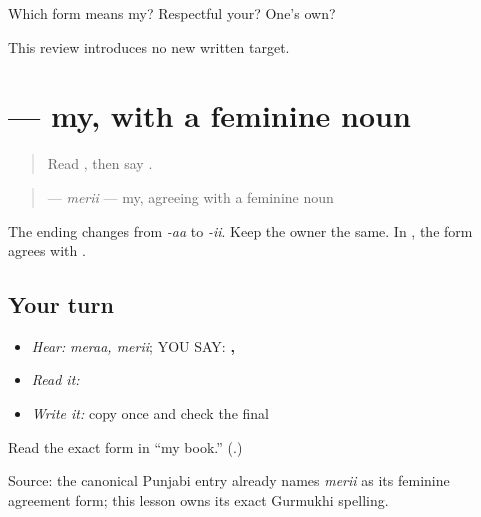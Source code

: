 \begin{tcolorbox}[breakable,colback=teal!4,colframe=teal!35!black,title={Before you move on}]
Which form means my? Respectful your? One's own?

This review introduces no new written target.
\end{tcolorbox}
\section[\texorpdfstring{\pa{ਮੇਰੀ} (merii)}{ਮੇਰੀ (merii)}]{ — my, with a feminine noun}

\label{lesson:PA-C185-meri}



\begin{quote}
Read \textbf{}, then say \textbf{}.
\end{quote}

\begin{grammarlens}[title={Grammar Lens: change the agreement ending}]
\begin{quote}
\textbf{} — \emph{merii} — my, agreeing with a feminine noun
\end{quote}

The ending changes from \emph{-aa} to \emph{-ii}. Keep the owner the same. In \textbf{ }, the form agrees with \textbf{}.
\end{grammarlens}

\subsection*{Your turn}
\begin{itemize}
\raggedright
  \item \emph{Hear:} \emph{meraa, merii}; YOU SAY: \textbf{, }
  \item \emph{Read it:} \textbf{ }
  \item \emph{Write it:} copy \textbf{} once and check the final \textbf{}
\end{itemize}

\begin{tcolorbox}[breakable,colback=teal!4,colframe=teal!35!black,title={Before you move on}]
Read the exact form in “my book.” (\textbf{}.)

Source: the canonical Punjabi \textbf{} entry already names \emph{merii} as its feminine agreement form; this lesson owns its exact Gurmukhi spelling.
\end{tcolorbox}
